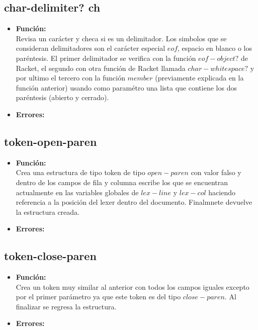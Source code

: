 \documentclass{article}
\begin{document}
\subsection{char-delimiter? ch}
\begin{itemize}
    \item \textbf{Función:} \\
    Revisa un carácter y checa si es un delimitador. Los simbolos que se consideran delimitadores son el carácter especial $eof$, espacio en blanco o los paréntesis. El primer delimitador se verifica con la función $eof-object?$ de Racket, el segundo con otra función de Racket llamada $char-whitespace?$ y por ultimo el tercero con la función $member$ (previamente explicada en la función anterior) usando como paramétro una lista que contiene los dos paréntesis (abierto y cerrado).
    \item \textbf{Errores:} \\ 
\end{itemize}
\subsection{token-open-paren}
\begin{itemize}
    \item \textbf{Función:} \\
    Crea una estructura de tipo token de tipo $open-paren$ con valor falso y dentro de los campos de fila y columna escribe los que se encuentran actualmente en las variables globales de $lex-line$ y $lex-col$ haciendo referencia a la posición del lexer dentro del documento. Finalmnete devuelve la estructura creada.
    \item \textbf{Errores:} \\ 
\end{itemize}
\subsection{token-close-paren}
\begin{itemize}
    \item \textbf{Función:} \\
    Crea un token muy similar al anterior con todos los campos iguales excepto por el primer parámetro ya que este token es del tipo $close-paren$. Al finalizar se regresa la estructura.
    \item \textbf{Errores:} \\ 
\end{itemize}
\end{document}
